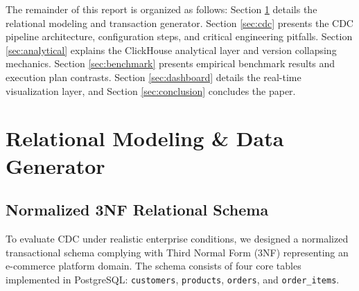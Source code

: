 \documentclass[peerreviewca]{IEEEtran}
\begin{document}
The remainder of this report is organized as follows: Section \ref{sec:relational} details the relational modeling and transaction generator. Section \ref{sec:cdc} presents the CDC pipeline architecture, configuration steps, and critical engineering pitfalls. Section \ref{sec:analytical} explains the ClickHouse analytical layer and version collapsing mechanics. Section \ref{sec:benchmark} presents empirical benchmark results and execution plan contrasts. Section \ref{sec:dashboard} details the real-time visualization layer, and Section \ref{sec:conclusion} concludes the paper.

\section{Relational Modeling \& Data Generator}
\label{sec:relational}

\subsection{Normalized 3NF Relational Schema}
To evaluate CDC under realistic enterprise conditions, we designed a normalized transactional schema complying with Third Normal Form (3NF) representing an e-commerce platform domain. The schema consists of four core tables implemented in PostgreSQL: \texttt{customers}, \texttt{products}, \texttt{orders}, and \texttt{order\_items}.
\end{document}
